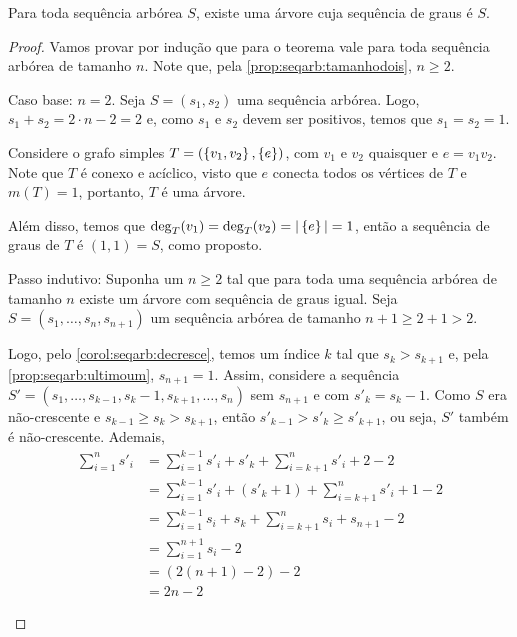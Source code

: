\begin{lemma}
    Para toda sequência arbórea $S$, existe uma árvore cuja sequência de graus é $S$.
\end{lemma}

\begin{proof}
    Vamos provar por indução que para o teorema vale para toda sequência arbórea de tamanho $n$. Note que, pela \cref{prop:seqarb:tamanhodois}, $n \geq 2$.

    \begin{ncasos}
        \item[Caso base:] $n = 2$. Seja $S = (s_1, s_2)$ uma sequência arbórea. Logo, $s_1 + s_2 = 2 \cdot n - 2 = 2$ e, como $s_1$ e $s_2$ devem ser positivos, temos que $s_1 = s_2 = 1$.

        Considere o grafo simples $T = (\set{v_1, v_2}, \set{e})$, com $v_1$ e $v_2$ quaisquer e $e = v_1 v_2$. Note que $T$ é conexo e acíclico, visto que $e$ conecta todos os vértices de $T$ e $m(T) = 1$, portanto, $T$ é uma árvore.

        Além disso, temos que $\deg_T(v_1) = \deg_T(v_2) = \abs{\set{e}} = 1$, então a sequência de graus de $T$ é $(1, 1) = S$, como proposto.

        \item[Passo indutivo:] Suponha um $n \geq 2$ tal que para toda  uma sequência arbórea de tamanho $n$ existe um árvore com sequência de graus igual. Seja $S = (s_1, \ldots, s_n, s_{n+1})$ um sequência arbórea de tamanho $n + 1 \geq 2 + 1 > 2$.

        Logo, pelo \cref{corol:seqarb:decresce}, temos um índice $k$ tal que $s_k > s_{k + 1}$ e, pela \cref{prop:seqarb:ultimoum}, $s_{n + 1} = 1$. Assim, considere a sequência $S' = (s_1, \ldots, s_{k - 1}, s_k - 1, s_{k + 1}, \ldots, s_n)$ sem $s_{n + 1}$ e com $s'_k = s_k - 1$. Como $S$ era não-crescente e $s_{k - 1} \geq s_k > s_{k + 1}$, então $s'_{k - 1} > s'_k \geq s'_{k + 1}$, ou seja, $S'$ também é não-crescente. Ademais,
        \begin{align*}
            \sum_{i = 1}^n s'_i &= \sum_{i = 1}^{k - 1} s'_i + s'_k + \sum_{i = k + 1}^n s'_i + 2 - 2 \\
            &= \sum_{i = 1}^{k - 1} s'_i + \left(s'_k + 1\right) + \sum_{i = k + 1}^n s'_i + 1 - 2 \\
            &= \sum_{i = 1}^{k - 1} s_i + s_k + \sum_{i = k + 1}^n s_i + s_{n + 1} - 2 \\
            &= \sum_{i = 1}^{n + 1} s_i - 2 \\
            &= (2 (n + 1) - 2) - 2 \\
            &= 2 n - 2
        \end{align*}


\end{ncasos}
\end{proof}
